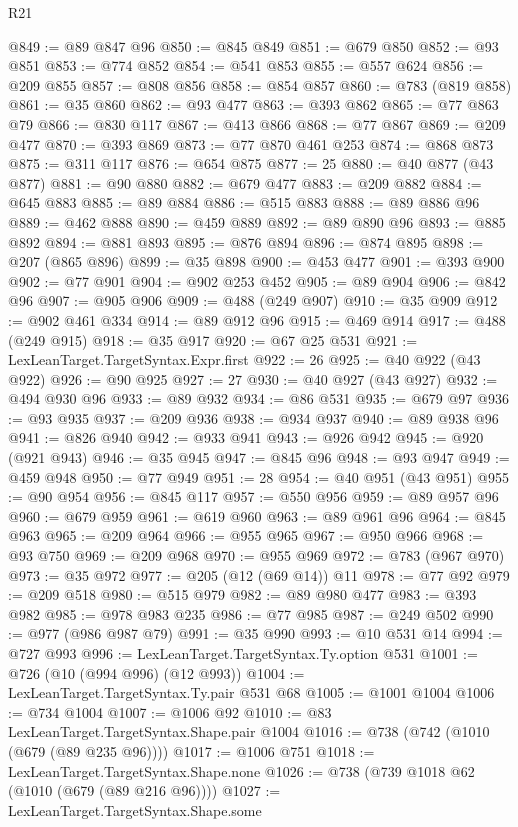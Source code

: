 \begin{lexlean}{R21}
\begin{coremodule}
@849 := @89 @847 @96
@850 := @845 @849
@851 := @679 @850
@852 := @93 @851
@853 := @774 @852
@854 := @541 @853
@855 := @557 @624
@856 := @209 @855
@857 := @808 @856
@858 := @854 @857
@860 := @783 (@819 @858)
@861 := @35 @860
@862 := @93 @477
@863 := @393 @862
@865 := @77 @863 @79
@866 := @830 @117
@867 := @413 @866
@868 := @77 @867
@869 := @209 @477
@870 := @393 @869
@873 := @77 @870 @461 @253
@874 := @868 @873
@875 := @311 @117
@876 := @654 @875
@877 := 25
@880 := @40 @877 (@43 @877)
@881 := @90 @880
@882 := @679 @477
@883 := @209 @882
@884 := @645 @883
@885 := @89 @884
@886 := @515 @883
@888 := @89 @886 @96
@889 := @462 @888
@890 := @459 @889
@892 := @89 @890 @96
@893 := @885 @892
@894 := @881 @893
@895 := @876 @894
@896 := @874 @895
@898 := @207 (@865 @896)
@899 := @35 @898
@900 := @453 @477
@901 := @393 @900
@902 := @77 @901
@904 := @902 @253 @452
@905 := @89 @904
@906 := @842 @96
@907 := @905 @906
@909 := @488 (@249 @907)
@910 := @35 @909
@912 := @902 @461 @334
@914 := @89 @912 @96
@915 := @469 @914
@917 := @488 (@249 @915)
@918 := @35 @917
@920 := @67 @25 @531
@921 := LexLeanTarget.TargetSyntax.Expr.first
@922 := 26
@925 := @40 @922 (@43 @922)
@926 := @90 @925
@927 := 27
@930 := @40 @927 (@43 @927)
@932 := @494 @930 @96
@933 := @89 @932
@934 := @86 @531
@935 := @679 @97
@936 := @93 @935
@937 := @209 @936
@938 := @934 @937
@940 := @89 @938 @96
@941 := @826 @940
@942 := @933 @941
@943 := @926 @942
@945 := @920 (@921 @943)
@946 := @35 @945
@947 := @845 @96
@948 := @93 @947
@949 := @459 @948
@950 := @77 @949
@951 := 28
@954 := @40 @951 (@43 @951)
@955 := @90 @954
@956 := @845 @117
@957 := @550 @956
@959 := @89 @957 @96
@960 := @679 @959
@961 := @619 @960
@963 := @89 @961 @96
@964 := @845 @963
@965 := @209 @964
@966 := @955 @965
@967 := @950 @966
@968 := @93 @750
@969 := @209 @968
@970 := @955 @969
@972 := @783 (@967 @970)
@973 := @35 @972
@977 := @205 (@12 (@69 @14)) @11
@978 := @77 @92
@979 := @209 @518
@980 := @515 @979
@982 := @89 @980 @477
@983 := @393 @982
@985 := @978 @983 @235
@986 := @77 @985
@987 := @249 @502
@990 := @977 (@986 @987 @79)
@991 := @35 @990
@993 := @10 @531 @14
@994 := @727 @993
@996 := LexLeanTarget.TargetSyntax.Ty.option @531
@1001 := @726 (@10 (@994 @996) (@12 @993))
@1004 := LexLeanTarget.TargetSyntax.Ty.pair @531 @68
@1005 := @1001 @1004
@1006 := @734 @1004
@1007 := @1006 @92
@1010 := @83 LexLeanTarget.TargetSyntax.Shape.pair @1004
@1016 := @738 (@742 (@1010 (@679 (@89 @235 @96))))
@1017 := @1006 @751
@1018 := LexLeanTarget.TargetSyntax.Shape.none
@1026 := @738 (@739 @1018 @62 (@1010 (@679 (@89 @216 @96))))
@1027 := LexLeanTarget.TargetSyntax.Shape.some

\end{coremodule}
\end{lexlean}
